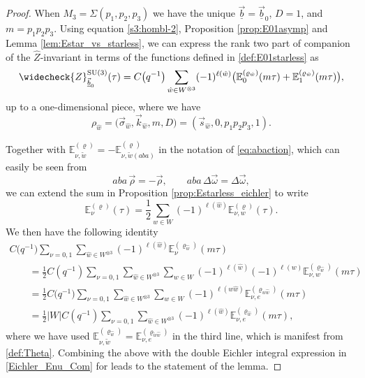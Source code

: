 \documentclass[pdftex]{sigma}
\def\BE{\mathbb{E}}
\def\bos{\varrho}
\def\bv{{\vec{\underline{b}}}}
\theoremstyle{definition}
\numberwithin{equation}{section}
\begin{document}
\begin{proof}
When $M_3=\Sigma(p_1,p_2,p_3)$ we have the unique $\bv=\bv_0$, $D=1$, and $m=p_1p_2p_3$. Using equation \eqref{s3:hombl-2}, Proposition \ref{prop:E01asymp} and Lemma \ref{lem:Estar_vs_starless}, we can express the rank two part of companion of the $\widehat{Z}$-invariant in terms of the functions \smash{$\BE_\nu^{(\bos)}(\tau)$} defined in \eqref{def:E01starless} as
	\begin{equation*}%
	\widecheck{Z}^{{\rm SU}(3)}_{\bv_0}(\tau)=
	C\bigl(q^{-1}\bigr) \sum\limits_{\hat{w} \in
	W^{\otimes 3}}(-1)^{\ell(\hat w)}
 \bigl(\mathbb{E}^{(\bos_{\hat{w}})}_0(m\tau)+
 \mathbb{E}^{(\bos_{\hat{w}})}_1({m}\tau)\bigr),
	\end{equation*}
up to a one-dimensional piece, where we have \[\rho_{\hat w} = \bigl(\vec{\sigma}_{\hat w},\vec{k}_{\hat w},m,D\bigr) = (\vec{s}_{\hat w}, 0, p_1p_2p_3, 1).\]

Together with $\BE_{\nu,\tilde w}^{(\bos)} = -
\BE_{\nu,\tilde w (aba)}^{(\bos_{})}$ in the notation of \eqref{eq:abaction}, which can easily be seen from
\[
aba \, \vec\rho=-\vec\rho, \qquad aba \, \Delta \vec\omega = \Delta \vec\omega,
\]
we can extend the sum in Proposition \ref{prop:Estarless_eichler} to write
\[%
	\BE_\nu^{(\bos)}(\tau) = {\frac{1}{2}} \sum_{{w} \in W} (-1)^{\ell(\hat w)} \BE_{\nu,w}^{(\bos)}(\tau).
\]
We then have the following identity
	\begin{gather*}
	C \bigl(q^{-1}\bigr)\sum_{\nu=0,1} \sum\limits_{\hat{w} \in
	W^{\otimes 3}}(-1)^{\ell(\hat w)}
\mathbb{E}^{(\bos_{\hat{w}})}_\nu(m\tau)
 \\ \qquad ={\frac{1}{2}}C (q^{-1})\sum_{\nu=0,1}
 \sum\limits_{\hat{w} \in
	W^{\otimes 3}} \sum_{{w} \in W} (-1)^{\ell(\hat w)} (-1)^{\ell(w)} \BE_{\nu,w}^{(\bos_{\hat w})}(m\tau) \\
	\qquad = {\frac{1}{2}}C \bigl(q^{-1}\bigr)\sum_{\nu=0,1}
 \sum\limits_{\hat{w} \in
	W^{\otimes 3}} \sum_{{w} \in W} (-1)^{\ell(w\hat w)}
	\BE_{\nu,e}^{(\bos_{w\hat w})}(m\tau)
	\\ \qquad = {\frac{1}{2}} |W|C (q^{-1})\sum_{\nu=0,1}
 \sum\limits_{\hat{w} \in
	W^{\otimes 3}} (-1)^{\ell(\hat w)}
	\BE_{\nu,e}^{(\bos_{\hat w})}(m\tau),
\end{gather*}
where we have used $\BE_{\nu,\tilde w}^{(\bos_{\hat w})} =
\BE_{\nu,e}^{(\bos_{\tilde w \hat w})}$ in the third line, which is manifest from \eqref{def:Theta}. Combining the above with the double Eichler integral expression in \eqref{Eichler_Enu_Com} for \smash{$\BE_{\nu,\tilde w}^{(\bos_{\hat w})}$} leads to the statement of the lemma.
\end{proof}
\end{document}
